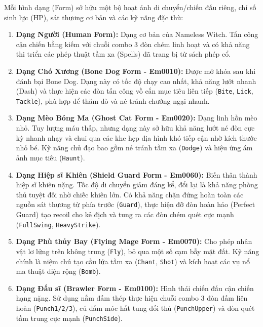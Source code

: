 \documentclass[../DoAn.tex]{subfiles}
\begin{document}

Mỗi hình dạng (Form) sở hữu một bộ hoạt ảnh di chuyển/chiến đấu riêng, chỉ số sinh lực (HP), sát thương cơ bản và các kỹ năng đặc thù:
\begin{enumerate}
    \item \textbf{Dạng Người (Human Form):} Dạng cơ bản của Nameless Witch. Tấn công cận chiến bằng kiếm với chuỗi combo 3 đòn chém linh hoạt và có khả năng thi triển các phép thuật tầm xa (Spells) đã trang bị từ sách phép cổ.
    \item \textbf{Dạng Chó Xương (Bone Dog Form - Em0010):} Được mở khóa sau khi đánh bại Bone Dog. Dạng này có tốc độ chạy cao nhất, khả năng lướt nhanh (Dash) và thực hiện các đòn tấn công vồ cắn mục tiêu liên tiếp (\texttt{Bite}, \texttt{Lick}, \texttt{Tackle}), phù hợp để thăm dò và né tránh chướng ngại nhanh.
    \item \textbf{Dạng Mèo Bóng Ma (Ghost Cat Form - Em0020):} Dạng linh hồn mèo nhỏ. Tuy lượng máu thấp, nhưng dạng này sở hữu khả năng lướt né đòn cực kỳ nhanh nhạy và chui qua các khe hẹp địa hình khó tiếp cận nhờ kích thước nhỏ bé. Kỹ năng chủ đạo bao gồm né tránh tầm xa (\texttt{Dodge}) và hiệu ứng ám ảnh mục tiêu (\texttt{Haunt}).
    \item \textbf{Dạng Hiệp sĩ Khiên (Shield Guard Form - Em0060):} Biến thân thành hiệp sĩ khiên nặng. Tốc độ di chuyển giảm đáng kể, đổi lại là khả năng phòng thủ tuyệt đối nhờ chiếc khiên lớn. Có khả năng chặn đứng hoàn toàn các nguồn sát thương từ phía trước (\texttt{Guard}), thực hiện đỡ đòn hoàn hảo (Perfect Guard) tạo recoil cho kẻ địch và tung ra các đòn chém quét cực mạnh (\texttt{FullSwing}, \texttt{HeavyStrike}).
    \item \textbf{Dạng Phù thủy Bay (Flying Mage Form - Em0070):} Cho phép nhân vật lơ lửng trên không trung (\texttt{Fly}), bỏ qua một số cạm bẫy mặt đất. Kỹ năng chính là niệm chú tạo cầu lửa tầm xa (\texttt{Chant}, \texttt{Shot}) và kích hoạt các vụ nổ ma thuật diện rộng (\texttt{Bomb}).
    \item \textbf{Dạng Đấu sĩ (Brawler Form - Em0100):} Hình thái chiến đấu cận chiến hạng nặng. Sử dụng nắm đấm thép thực hiện chuỗi combo 3 đòn đấm liên hoàn (\texttt{Punch1/2/3}), cú đấm móc hất tung đối thủ (\texttt{PunchUpper}) và đòn quét tầm trung cực mạnh (\texttt{PunchSide}).
\end{enumerate}
\end{document}
